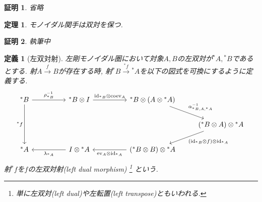 \documentclass[a4paper,12pt]{ltjsarticle}
\theoremstyle{break}
\newtheorem{defn}[thm]{定義}
\newtheorem{lem}[thm]{補題}
\newtheorem{thrm}[thm]{定理}
\newtheorem*{prf}{証明}
\newcommand{\xr}[1]{\xrightarrow{#1}}
\newcommand{\id}{\mathrm{id}}
\newcommand{\eva}{\mathrm{ev}}
\newcommand{\coev}{\mathrm{coev}}
\newcommand{\al}{\alpha}
\newcommand{\la}{\lambda}
\newcommand{\ve}{\varepsilon}
\newcommand{\dav}{\dashv}
\newcommand{\ot}{\otimes}
\numberwithin{equation}{section}
\begin{document}
\begin{prf}
  省略
\end{prf}

\begin{thrm}
  モノイダル関手は双対を保つ. 
\end{thrm}

\begin{prf}
  執筆中
\end{prf}





\begin{defn}[左双対射]
  左剛モノイダル圏において対象$A,B$の左双対が${}^*A,{}^*B$であるとする. 
  射$A \xr{f} B$が存在する時, 射${}^*B \xr{{}^*f} {}^*A$を以下の図式を可換にするように定義する.
  \[\begin{tikzcd}
    {{}^*B} && {{}^*B \ot I} && {{}^*B \ot (A \ot {}^*A)} \\
    &&&&& {({}^*B \ot A) \ot {}^*A} \\
    {{}^*A} && {I \ot {}^*A} && {({}^*B \ot B) \ot {}^*A}
    \arrow["{\rho_{{}^*B}^{-1}}", from=1-1, to=1-3]
    \arrow["{\id_{{}^*B} \ot \coev_A}", from=1-3, to=1-5]
    \arrow["{\al_{{}^*B,A,{}^*A}^{-1}}", from=1-5, to=2-6]
    \arrow["{(\id_{{}^*B} \ot f) \ot \id_{{}^*A}}", from=2-6, to=3-5]
    \arrow["{\eva_A \ot \id_{{}^*A}}", from=3-5, to=3-3]
    \arrow["{\la_{{}^*A}}", from=3-3, to=3-1]
    \arrow["{{}^*f}"', from=1-1, to=3-1]
  \end{tikzcd}\]
  射${}^*f$を$f$の左双対射(left dual morphism)
  \footnote{
    単に左双対(left dual)や左転置(left transpose)ともいわれる. 
  }
  という. 
\end{defn}
\end{document}
